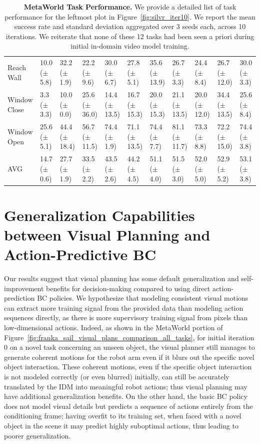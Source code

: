 \begin{table}[h!]
{\begin{tabular}{@{}lllllllllll@{}}
Reach Wall        & 10.0 ($\pm$5.8) & 32.2 ($\pm$1.9)  & 22.2 ($\pm$9.6)  & 30.0 ($\pm$6.7)  & 27.8 ($\pm$5.1)  & 35.6 ($\pm$13.9) & 26.7 ($\pm$3.3)  & 24.4 ($\pm$8.4)  & 26.7 ($\pm$12.0) & 30.0 ($\pm$3.3)  \\
Window Close      & 3.3 ($\pm$3.3)  & 10.0 ($\pm$0.0)  & 25.6 ($\pm$36.0) & 14.4 ($\pm$13.5) & 16.7 ($\pm$15.3) & 20.0 ($\pm$15.3) & 21.1 ($\pm$13.5) & 20.0 ($\pm$12.0) & 34.4 ($\pm$13.5) & 25.6 ($\pm$8.4)  \\
Window Open       & 25.6 ($\pm$5.1) & 44.4 ($\pm$18.4) & 56.7 ($\pm$11.5) & 74.4 ($\pm$1.9)  & 71.1 ($\pm$13.5) & 74.4 ($\pm$7.7)  & 81.1 ($\pm$11.7) & 73.3 ($\pm$8.8)  & 72.2 ($\pm$15.0) & 74.4 ($\pm$3.8)  \\ \midrule
AVG               & 14.7 ($\pm$0.6) & 27.7 ($\pm$1.9)  & 33.5 ($\pm$2.2)  & 43.5 ($\pm$2.6)  & 44.2 ($\pm$4.5)  & 51.1 ($\pm$4.0)  & 51.5 ($\pm$3.0)  & 52.0 ($\pm$5.0)  & 52.9 ($\pm$5.2)  & 53.1 ($\pm$3.8)  \\ \bottomrule
\end{tabular}
}
\vspace{1em}
\caption[]{\textbf{MetaWorld Task Performance.} We provide a detailed list of task performance for the leftmost plot in Figure~\ref{fig:silvr_iter10}. We report the mean success rate and standard deviation aggregated over $3$ seeds each, across 10 iterations.  We reiterate that none of these 12 tasks had been seen a priori during initial in-domain video model training.}
\label{table:silvr_expert_task_perf_decomposition}
\end{table}

\section{Generalization Capabilities between Visual Planning and Action-Predictive BC}

Our results suggest that visual planning has some default generalization and self-improvement benefits for decision-making compared to using direct action-prediction BC policies.  We hypothesize that modeling consistent visual motions can extract more training signal from the provided data than modeling action sequences directly, as there is more supervisory training signal from pixels than low-dimensional actions.  Indeed, as shown in the MetaWorld portion of Figure~\ref{fig:franka_sail_visual_plans_comparison_all_tasks}, for initial iteration 0 on a novel task concerning an unseen object, the visual planner still manages to generate coherent motions for the robot arm even if it blurs out the specific novel object interaction. These coherent motions, even if the specific object interaction is not modeled correctly (or even blurred) initially, can still be accurately translated by the IDM into meaningful robot actions; thus visual planning may have additional generalization benefits. On the other hand, the basic BC policy does not model visual details but predicts a sequence of actions entirely from the conditioning frame; having overfit to its training set, when faced with a novel object in the scene it may predict highly suboptimal actions, thus leading to poorer generalization.




